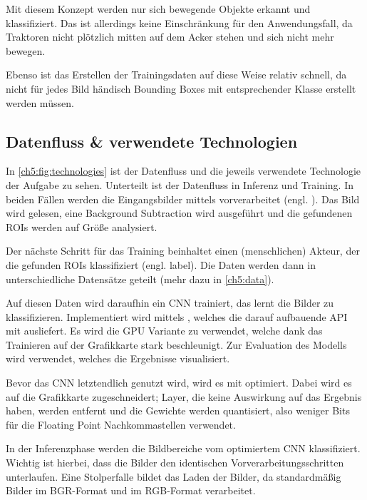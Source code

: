 \bigskip
Mit diesem Konzept werden nur sich bewegende Objekte erkannt und klassifiziert.
Das ist allerdings keine Einschränkung für den Anwendungsfall, da Traktoren nicht plötzlich mitten auf dem Acker stehen und sich nicht mehr bewegen.

Ebenso ist das Erstellen der Trainingsdaten auf diese Weise relativ schnell, da nicht für jedes Bild händisch Bounding Boxes mit entsprechender Klasse erstellt werden müssen.

\subsection{Datenfluss \& verwendete Technologien} \label{ch5:tech}
In \autoref{ch5:fig:technologies} ist der Datenfluss und die jeweils verwendete Technologie der Aufgabe zu sehen.
Unterteilt ist der Datenfluss in Inferenz und Training.
In beiden Fällen werden die Eingangsbilder mittels  vorverarbeitet (engl. ). Das Bild wird gelesen, eine Background Subtraction wird ausgeführt und die gefundenen \acp{ROI} werden auf Größe analysiert.

\bigskip
Der nächste Schritt für das Training beinhaltet einen (menschlichen) Akteur, der die gefunden \acp{ROI} klassifiziert (engl. label).
Die Daten werden dann in unterschiedliche Datensätze geteilt (mehr dazu in \autoref{ch5:data}).

Auf diesen Daten wird daraufhin ein \ac{CNN} trainiert, das lernt die Bilder zu klassifizieren.
Implementiert wird mittels , welches die darauf aufbauende API  mit ausliefert.
Es wird die GPU Variante zu verwendet, welche dank  das Trainieren auf der Grafikkarte stark beschleunigt.
Zur Evaluation des Modells wird  verwendet, welches die Ergebnisse visualisiert.

\bigskip
Bevor das \ac{CNN} letztendlich genutzt wird, wird es mit  optimiert.
Dabei wird es auf die Grafikkarte zugeschneidert; Layer, die keine Auswirkung auf das Ergebnis haben, werden entfernt und die Gewichte werden quantisiert, also weniger Bits für die Floating Point Nachkommastellen verwendet.

In der Inferenzphase werden die Bildbereiche vom optimiertem \ac{CNN} klassifiziert.
Wichtig ist hierbei, dass die Bilder den identischen Vorverarbeitungsschritten unterlaufen.
Eine Stolperfalle bildet das Laden der Bilder, da  standardmäßig Bilder im BGR-Format und  im RGB-Format verarbeitet.

